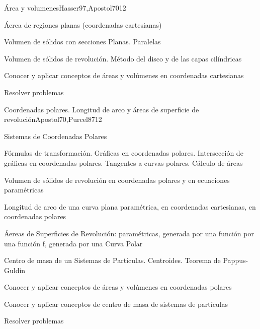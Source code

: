 \begin{syllabus}
\begin{unit}{Área y volumenes}{Hasser97,Apostol70}{12}
\begin{topics}
      \item Áerea de regiones planas (coordenadas cartesianas)
      \item Volumen de sólidos con secciones Planas. Paralelas
      \item Volumen de sólidos de revolución. Método del disco y de las capas cilíndricas
\end{topics}

\begin{learningoutcomes}
	\item Conocer y aplicar conceptos de áreas y volúmenes en coordenadas cartesianas
	\item Resolver problemas
\end{learningoutcomes}
\end{unit}

\begin{unit}{Coordenadas polares. Longitud de arco y áreas de superficie de revolución}{Apostol70,Purcel87}{12}
\begin{topics}
	\item Sistemas de Coordenadas Polares
	\item Fórmulas de transformación. Gráficas en coordenadas polares. Intersección de gráficas en coordenadas polares. Tangentes a curvas polares. Cálculo de áreas
	\item Volumen de sólidos de revolución en coordenadas polares y en ecuaciones paramétricas
	\item Longitud de arco de una curva plana paramétrica, en coordenadas cartesianas, en  coordenadas polares
	\item Áereas de Superficies de Revolución: paramétricas,  generada por una función por una  función f, generada por una Curva  Polar
	\item Centro de masa de un Sistemas de Partículas. Centroides. Teorema de Pappus-Guldin
\end{topics}

\begin{learningoutcomes}
	\item Conocer y aplicar conceptos de áreas y volúmenes en coordenadas polares
	\item Conocer y aplicar conceptos de centro de masa de sistemas de partículas
	\item Resolver problemas
\end{learningoutcomes}
\end{unit}


\end{syllabus}
